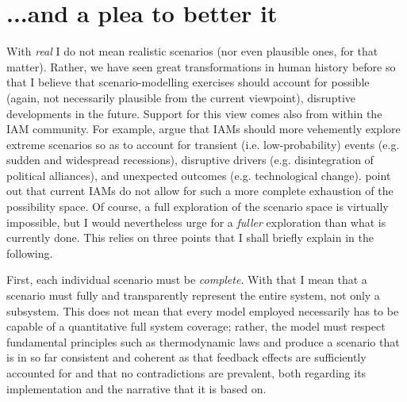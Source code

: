 \documentclass{article}
\begin{document}
\begin{refsection}
\label{discussion}
\section{...and a plea to better it}

With \textit{real} I do not mean realistic scenarios (nor even plausible ones, for that matter). Rather, we have seen great transformations in human history before \parencite{fischer_2014} so that I believe that scenario-modelling exercises should account for possible (again, not necessarily plausible from the current viewpoint), disruptive developments in the future.\footnotemark{} Support for this view comes also from within the IAM community. For example, \textcite{mccollum_2020} argue that IAMs should more vehemently explore extreme scenarios so as to account for transient (i.e. low-probability) events (e.g. sudden and widespread recessions), disruptive drivers (e.g. disintegration of political alliances), and unexpected outcomes (e.g. technological change). \textcite{gambhir_2022} point out that current IAMs do not allow for such a more complete exhaustion of the possibility space. Of course, a full exploration of the scenario space is virtually impossible, but I would nevertheless urge for a \textit{fuller} exploration than what is currently done. This relies on three points that I shall briefly explain in the following.


First, each individual scenario must be \textit{complete}. With that I mean that a scenario must fully and transparently represent the entire system, not only a subsystem. This does not mean that every model employed necessarily has to be capable of a quantitative full system coverage; rather, the model must respect fundamental principles such as thermodynamic laws and produce a scenario that is in so far consistent and coherent as that feedback effects are sufficiently accounted for and that no contradictions are prevalent, both regarding its implementation and the narrative that it is based on.


\end{refsection}
\end{document}
